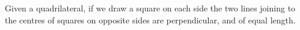 Given a quadrilateral, if we draw a square on each side
the two lines joining to the centres of squares
on opposite sides are perpendicular, and of equal length.